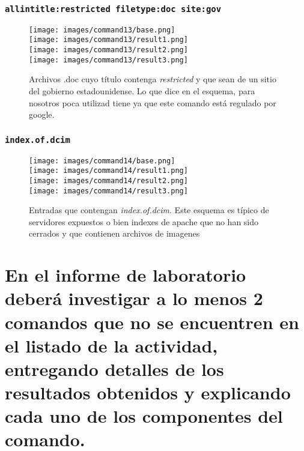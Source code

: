 \documentclass[11pt]{utalcaDoc}
\begin{document}
\subsubsection{\texttt{allintitle:restricted filetype:doc site:gov}}
\begin{figure}[H]
	\centering
\begin{multicols}{4}
	\texttt{[image: images/command13/base.png]}\\
	\texttt{[image: images/command13/result1.png]}\\
	\texttt{[image: images/command13/result2.png]}\\
	\texttt{[image: images/command13/result3.png]}\\
\end{multicols}
\caption{Archivos .doc cuyo título contenga \textit{restricted} y que sean de un sitio del gobierno estadounidense. Lo que dice en el esquema, para nosotros poca utilizad tiene ya que este comando está regulado por google.}
\label{FIG:command13}
\end{figure}



\subsubsection{\texttt{index.of.dcim}}
\begin{figure}[H]
	\centering
\begin{multicols}{4}
	\texttt{[image: images/command14/base.png]}\\
	\texttt{[image: images/command14/result1.png]}\\
	\texttt{[image: images/command14/result2.png]}\\
	\texttt{[image: images/command14/result3.png]}\\
\end{multicols}
\caption{Entradas que contengan \textit{index.of.dcim}. Este esquema es típico de servidores expuestos o bien indexes de apache que no han sido cerrados y que contienen archivos de imagenes}
\label{FIG:command14}
\end{figure}

\section{En el informe de laboratorio deberá investigar a lo menos 2 comandos que no se encuentren en el listado de la actividad, entregando detalles de los resultados obtenidos y explicando cada uno de los componentes del comando.\cite{REF:google}\cite{REF:moz}}
\end{document}
